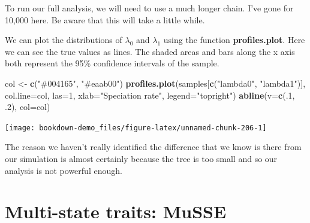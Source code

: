 \documentclass[
]{book}
\newenvironment{Shaded}{\begin{snugshade}}{\end{snugshade}}
\newcommand{\DataTypeTok}[1]{\textcolor[rgb]{0.13,0.29,0.53}{#1}}
\newcommand{\DecValTok}[1]{\textcolor[rgb]{0.00,0.00,0.81}{#1}}
\newcommand{\FloatTok}[1]{\textcolor[rgb]{0.00,0.00,0.81}{#1}}
\newcommand{\KeywordTok}[1]{\textcolor[rgb]{0.13,0.29,0.53}{\textbf{#1}}}
\newcommand{\NormalTok}[1]{#1}
\newcommand{\OperatorTok}[1]{\textcolor[rgb]{0.81,0.36,0.00}{\textbf{#1}}}
\newcommand{\StringTok}[1]{\textcolor[rgb]{0.31,0.60,0.02}{#1}}
\begin{document}
To run our full analysis, we will need to use a much longer chain. I've gone for 10,000 here. Be aware that this will take a little while.

\begin{Shaded}
\end{Shaded}

We can plot the distributions of \(\lambda_{0}\) and \(\lambda_{1}\) using the function \textbf{profiles.plot}. Here we can see the true values as lines. The shaded areas and bars along the x axis both represent the 95\% confidence intervals of the sample.

\begin{Shaded}
\begin{Highlighting}[]
\NormalTok{col \textless{}{-}}\StringTok{ }\KeywordTok{c}\NormalTok{(}\StringTok{"\#004165"}\NormalTok{, }\StringTok{"\#eaab00"}\NormalTok{)}
\KeywordTok{profiles.plot}\NormalTok{(samples[}\KeywordTok{c}\NormalTok{(}\StringTok{"lambda0"}\NormalTok{, }\StringTok{"lambda1"}\NormalTok{)], }\DataTypeTok{col.line=}\NormalTok{col, }\DataTypeTok{las=}\DecValTok{1}\NormalTok{,}
              \DataTypeTok{xlab=}\StringTok{"Speciation rate"}\NormalTok{, }\DataTypeTok{legend=}\StringTok{"topright"}\NormalTok{)}
\KeywordTok{abline}\NormalTok{(}\DataTypeTok{v=}\KeywordTok{c}\NormalTok{(.}\DecValTok{1}\NormalTok{, }\FloatTok{.2}\NormalTok{), }\DataTypeTok{col=}\NormalTok{col)}
\end{Highlighting}
\end{Shaded}

\begin{center}\texttt{[image: bookdown-demo\_files/figure-latex/unnamed-chunk-206-1]} \end{center}

The reason we haven't really identified the difference that we know is there from our simulation is almost certainly because the tree is too small and so our analysis is not powerful enough.

\hypertarget{multi-state-traits-musse}{%
\section{Multi-state traits: MuSSE}\label{multi-state-traits-musse}}
\end{document}
